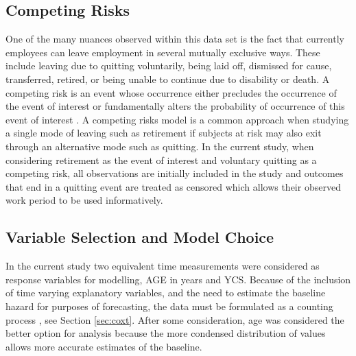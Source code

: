 \documentclass[12pt,letterpaper]{article}
\begin{document}

\subsection{Competing Risks}
One of the many nuances observed within this data set is the fact that currently employees can leave employment in several mutually exclusive ways.  These include leaving due to quitting voluntarily, being laid off, dismissed for cause, transferred, retired, or being unable to continue due to disability or death. A competing risk is an event whose occurrence either precludes the occurrence of the event of interest or fundamentally alters the probability of occurrence of this event of interest \citep{tableman2003}.  A competing risks model is a common approach when studying a single mode of leaving such as retirement if subjects at risk may also exit through an alternative mode such as quitting.  In the current study, when considering retirement as the event of interest and voluntary quitting as a competing risk, all observations are initially included in the study and outcomes that end in a quitting event are treated as censored which allows their observed work period to be used informatively.


\subsection{Variable Selection and Model Choice} \label{sec:modelchoice}
In the current study two equivalent time measurements were considered as response variables for modelling, AGE in years and YCS.  Because of the inclusion of time varying explanatory variables, and the need to estimate the baseline hazard for purposes of forecasting, the data must be formulated as a counting process , see Section \ref{sec:coxt}.  After some consideration, age was considered the better option for analysis because the more condensed distribution of values allows more accurate estimates of the baseline.
\end{document}
